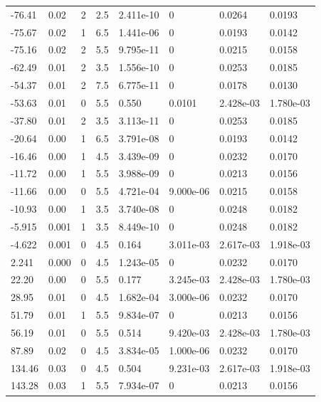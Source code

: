 \documentclass[preview]{standalone}
\begin{document}
{{\begin{tabular}{L{1.2cm}C{1.2cm} C{0.3cm}C{0.5cm} C{1.4cm}C{1.4cm} C{1.4cm}C{1.4cm}}
  -76.41  &  0.02  & 2     & 2.5 &  2.411e-10  & 0  & 0.0264 &  0.0193   \\ 
  -75.67  &  0.02  & 1     & 6.5 &  1.441e-06  & 0  & 0.0193 &  0.0142   \\ 
  -75.16  &  0.02  & 2     & 5.5 &  9.795e-11  & 0  & 0.0215 &  0.0158   \\ 
  -62.49  &  0.01  & 2     & 3.5 &  1.556e-10  & 0  & 0.0253 &  0.0185   \\ 
  -54.37  &  0.01  & 2     & 7.5 &  6.775e-11  & 0  & 0.0178 &  0.0130   \\ 
  -53.63  &  0.01  & 0     & 5.5 &  0.550  & 0.0101  & 2.428e-03 &  1.780e-03   \\ 
  -37.80  &  0.01  & 2     & 3.5 &  3.113e-11  & 0  & 0.0253 &  0.0185   \\ 
  -20.64  &  0.00  & 1     & 6.5 &  3.791e-08  & 0  & 0.0193 &  0.0142   \\ 
  -16.46  &  0.00  & 1     & 4.5 &  3.439e-09  & 0  & 0.0232 &  0.0170   \\ 
  -11.72  &  0.00  & 1     & 5.5 &  3.988e-09  & 0  & 0.0213 &  0.0156   \\ 
  -11.66  &  0.00  & 0     & 5.5 &  4.721e-04  & 9.000e-06  & 0.0215 &  0.0158   \\ 
  -10.93  &  0.00  & 1     & 3.5 &  3.740e-08  & 0  & 0.0248 &  0.0182   \\ 
  -5.915  &  0.001  & 1     & 3.5 &  8.449e-10  & 0  & 0.0248 &  0.0182   \\ 
  -4.622  &  0.001  & 0     & 4.5 &  0.164  & 3.011e-03  & 2.617e-03 &  1.918e-03   \\ 
  2.241  &  0.000  & 0     & 4.5 &  1.243e-05  & 0  & 0.0232 &  0.0170   \\ 
  22.20  &  0.00  & 0     & 5.5 &  0.177  & 3.245e-03  & 2.428e-03 &  1.780e-03   \\ 
  28.95  &  0.01  & 0     & 4.5 &  1.682e-04  & 3.000e-06  & 0.0232 &  0.0170   \\ 
  51.79  &  0.01  & 1     & 5.5 &  9.834e-07  & 0  & 0.0213 &  0.0156   \\ 
  56.19  &  0.01  & 0     & 5.5 &  0.514  & 9.420e-03  & 2.428e-03 &  1.780e-03   \\ 
  87.89  &  0.02  & 0     & 4.5 &  3.834e-05  & 1.000e-06  & 0.0232 &  0.0170   \\ 
  134.46  &  0.03  & 0     & 4.5 &  0.504  & 9.231e-03  & 2.617e-03 &  1.918e-03   \\ 
  143.28  &  0.03  & 1     & 5.5 &  7.934e-07  & 0  & 0.0213 &  0.0156   \\ 

\end{tabular}}}
\end{document}
